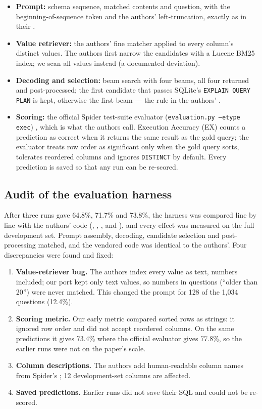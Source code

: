 \begin{itemize}
	\item \textbf{Prompt:} schema sequence, matched contents and question, with the beginning-of-sequence token and the authors' left-truncation, exactly as in their .
	\item \textbf{Value retriever:} the authors' fine matcher applied to every column's distinct values. The authors first narrow the candidates with a Lucene BM25 index; we scan all values instead (a documented deviation).
	\item \textbf{Decoding and selection:} beam search with four beams, all four returned and post-processed; the first candidate that passes SQLite's \texttt{EXPLAIN QUERY PLAN} is kept, otherwise the first beam --- the rule in the authors' .
	\item \textbf{Scoring:} the official Spider test-suite evaluator (\texttt{evaluation.py --etype exec}) \cite{zhong2020semantic}, which is what the authors call. Execution Accuracy (EX) counts a prediction as correct when it returns the same result as the gold query; the evaluator treats row order as significant only when the gold query sorts, tolerates reordered columns and ignores \texttt{DISTINCT} by default. Every prediction is saved so that any run can be re-scored.
\end{itemize}

\subsection{Audit of the evaluation harness}

After three runs gave 64.8\%, 71.7\% and 73.8\%, the harness was compared line by line with the authors' code (, , ,  and ), and every effect was measured on the full development set. Prompt assembly, decoding, candidate selection and post-processing matched, and the vendored code was identical to the authors'. Four discrepancies were found and fixed:

\begin{enumerate}
	\item \textbf{Value-retriever bug.} The authors index every value as text, numbers included; our port kept only text values, so numbers in questions (``older than 20'') were never matched. This changed the prompt for 128 of the 1,034 questions (12.4\%).
	\item \textbf{Scoring metric.} Our early metric compared sorted rows as strings: it ignored row order and did not accept reordered columns. On the same predictions it gives 73.4\% where the official evaluator gives 77.8\%, so the earlier runs were not on the paper's scale.
	\item \textbf{Column descriptions.} The authors add human-readable column names from Spider's ; 12 development-set columns are affected.
	\item \textbf{Saved predictions.} Earlier runs did not save their SQL and could not be re-scored.
\end{enumerate}

